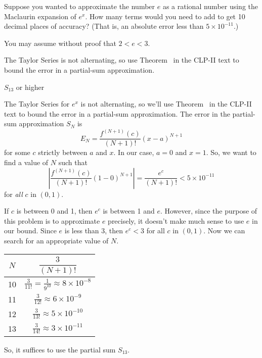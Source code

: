\begin{question}
	Suppose you wanted to approximate the number $e$ as a rational number using the Maclaurin expansion of $e^x$. How many terms would you need to add to get 10 decimal places of accuracy?
	(That is, an absolute error less than $5\times10^{-11}$.)

	You may assume without proof that $2<e<3$.
\end{question}
\begin{hint}
	The Taylor Series is not alternating, so use  Theorem~ in the CLP-II text to bound the error in a partial-sum approximation.
\end{hint}
\begin{answer}
$S_{13}$	or higher
\end{answer}
\begin{solution}The Taylor Series for $e^x$ is not alternating, so we'll use  Theorem~ in the CLP-II text to bound the error in a partial-sum approximation. The error in the partial-sum approximation $S_N$ is
	\[E_N=\frac{f^{(N+1)}(c)}{(N+1)!}(x-a)^{N+1}\]
	for some $c$ strictly between $a$ and $x$. In our case, $a=0$ and $x=1$. So, we want to find a value of $N$ such that
	\[\left|\frac{f^{(N+1)}(c)}{(N+1)!}\left(1-0\right)^{N+1}\right|=\frac{e^c}{(N+1)!}<5\times 10^{-11}\]
	for \emph{all} $c$ in $(0,1)$.

	If $c$ is between 0 and 1, then $e^c$ is between 1 and $e$. However, since the purpose of this problem is to approximate $e$ precisely, it doesn't make much sense to use $e$ in our bound. Since $e$ is less than 3, then $e^c<3$ for all $c$ in $(0,1)$. Now we can search for an appropriate value of $N$.

	\begin{center}
		\begin{tabular}{|c|c|}
			\hline
			$N$&$ \dfrac{3}{(N+1)!}$\\ \hline
			10 & $\displaystyle \frac{3}{11!}=\frac{1}{9^{10}}\approx 8\times 10^{-8}$\\\hline
			11 & $\displaystyle \frac{3}{12!}\approx 6\times 10^{-9}$\\\hline
			12 & $\displaystyle \frac{3}{13!}\approx 5\times 10^{-10}$\\\hline
			13 & $\displaystyle \frac{3}{14!}\approx 3\times 10^{-11}$\\
			\hline
		\end{tabular}
	\end{center}
	So, it suffices to use the partial sum $S_{13}$.
\end{solution}



